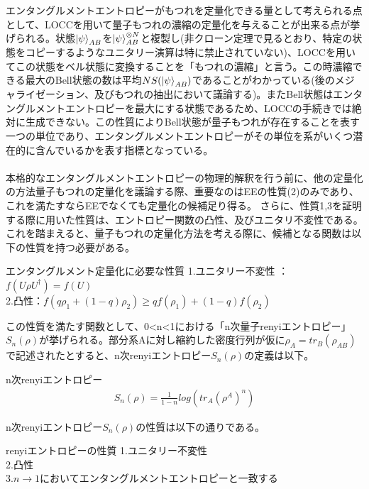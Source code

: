 \documentclass[a4paper,10.5pt]{article}
\numberwithin{equation}{section}
\begin{document}
エンタングルメントエントロピーがもつれを定量化できる量として考えられる点として、LOCCを用いて量子もつれの濃縮の定量化を与えることが出来る点が挙げられる。状態$\ket{\psi}_{AB}$を$\ket{\psi}_{AB}^{\otimes N}$と複製し(非クローン定理で見るとおり、特定の状態をコピーするようなユニタリー演算は特に禁止されていない)、LOCCを用いてこの状態をベル状態に変換することを「もつれの濃縮」と言う。この時濃縮できる最大のBell状態の数は平均$NS(\ket{\psi}_{AB})$であることがわかっている(後のメジャライゼーション、及びもつれの抽出において議論する)。またBell状態はエンタングルメントエントロピーを最大にする状態であるため、LOCCの手続きでは絶対に生成できない。この性質によりBell状態が量子もつれが存在することを表す一つの単位であり、エンタングルメントエントロピーがその単位を系がいくつ潜在的に含んでいるかを表す指標となっている。\\
\\
本格的なエンタングルメントエントロピーの物理的解釈を行う前に、他の定量化の方法量子もつれの定量化を議論する際、重要なのはEEの性質(2)のみであり、これを満たすならEEでなくても定量化の候補足り得る。
さらに、性質1,3を証明する際に用いた性質は、エントロピー関数の凸性、及びユニタリ不変性である。これを踏まえると、量子もつれの定量化方法を考える際に、候補となる関数は以下の性質を持つ必要がある。
\begin{resultbox}{エンタングルメント定量化に必要な性質}
1.ユニタリー不変性 ：$f(U\rho U^{\dagger})=f(U)$\\
2.凸性：$f(q\rho_{1}+(1-q)\rho_{2})\geq qf(\rho_{1})+(1-q)f(\rho_{2})$
\end{resultbox}
この性質を満たす関数として、0<n<1における「n次量子renyiエントロピー」$S_{n}(\rho)$が挙げられる。部分系Aに対し縮約した密度行列が仮に$\rho_{A}=tr_{B}(\rho_{AB})$で記述されたとすると、n次renyiエントロピー$S_{n}(\rho)$の定義は以下。
\begin{defbox}{n次renyiエントロピー}
\begin{equation}\begin{split}
    S_{n}(\rho) = \frac{1}{1-n}log(tr_{A}(\rho^{A})^{n})
\end{split} \end{equation}
\end{defbox}
n次renyiエントロピー$S_{n}(\rho)$の性質は以下の通りである。
\begin{resultbox}{renyiエントロピーの性質}
1.ユニタリー不変性\\
2.凸性\\
3.$n\to 1$においてエンタングルメントエントロピーと一致する
\end{resultbox}
\end{document}
